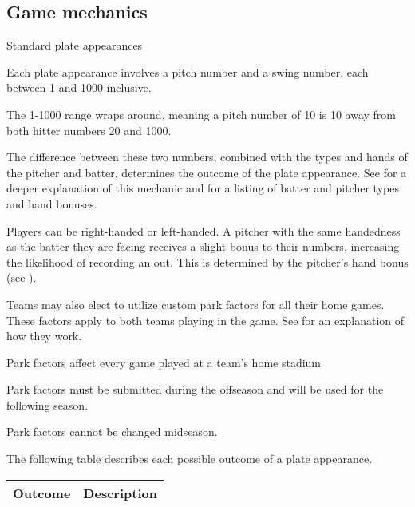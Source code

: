 
\subsection{Game mechanics}
\begin{deepEnumerate}
	\item Standard plate appearances
	\begin{deepEnumerate}
		\item Each plate appearance involves a pitch number and a swing number, each between 1 and 1000 inclusive.
		\item The 1-1000 range wraps around, meaning a pitch number of 10 is 10 away from both hitter numbers 20 and 1000.
		\item The difference between these two numbers, combined with the types and hands of the pitcher and batter, 
		determines the outcome of the plate appearance. 
		See  for a deeper explanation of this mechanic 
		and for a listing of batter and pitcher types and hand bonuses.
		\item Players can be right-handed or left-handed. 
		A pitcher with the same handedness as the batter they are facing receives a slight bonus to their numbers, 
		increasing the likelihood of recording an out. 
		This is determined by the pitcher's hand bonus (see ).
		\item Teams may also elect to utilize custom park factors for all their home games. 
		These factors apply to both teams playing in the game. 
		See  for an explanation of how they work.
		\begin{deepEnumerate}
			\item Park factors affect every game played at a team's home stadium
			\item Park factors must be submitted during the offseason and will be used for the following season. 
			\item Park factors cannot be changed midseason.
		\end{deepEnumerate}
		\item The following table describes each possible outcome of a plate appearance.
		\begin{center}
			\begin{longtable}{|p{3cm}|p{8cm}|}
				\hline
				\textbf{Outcome}           & \textbf{Description}                                                  \\
				\hline

\end{longtable}
\end{center}
\end{deepEnumerate}
\end{deepEnumerate}
